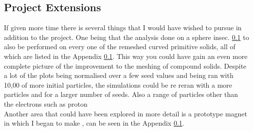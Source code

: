 \documentclass[12pt,a4paper]{article}
\begin{document}
\subsection{Project Extensions}
If given more time there is several things that I  would have wished to pursue in addition to the project. One being that the analysis done on a sphere insec. \ref{} to also be performed on every one of the remeshed curved primitive solids, all of which are listed in the Appendix \ref{}. This way you could have gain an even more complete picture of the improvement to the meshing of compound solids. Despite a lot of the plots being normalised over a few seed values and being ran with 10,00 of more initial particles, the simulations could be re reran with a more particles and for a larger number of seeds. Also a range of particles other than the electrons such as proton\\
Another area that could have been explored in more detail is a prototype magnet in which I began to make , can be seen in the Appendix \ref{}.


\newpage
\newpage
\footnotesize
\end{document}
